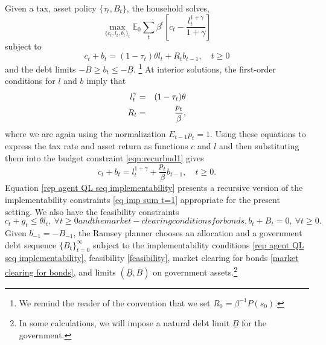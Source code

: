 \documentclass[thmsb,11pt]{article}
\begin{document}
Given a tax, asset policy $\{\tau_t,B_t\}$, the household solves,
\begin{equation}
 \max_{\{c_t,l_t,b_{t}\}_t}\mathbb{E}_0\sum_{t}\beta^t \left[c_t-\frac{l_t^{1+\gamma}}{1+\gamma}\right]
\end{equation}
subject to
\begin{equation}\label{eqn:recurbud1}
c_t+b_{t}=(1-\tau_t)\theta l_t+R_tb_{t-1} , \quad t\geq 0
\end{equation}
and the debt limits $  - \overline B \geq b_t \leq  - \underline B$.%
\footnote{We  remind the reader of  the convention  that we set  $R_{0}=\beta^{-1} P(s_0)$.}
At interior solutions, the first-order conditions %
for $l$ and $b$ imply that
\begin{eqnarray*}
l_t^\gamma & = &(1-\tau_t) \theta \cr
R_t & = & \frac{p_t}{\beta},
\end{eqnarray*}
where we are again using the normalization $E_{t-1} p_t = 1$.
Using these equations %
to express   the tax rate and asset return
 as functions   $c$ and $l$ and then substituting them into the  budget constraint \eqref{eqn:recurbud1} gives %
 \begin{equation} \label{rep agent QL seq implementability} c_t + b_t = l_t^{1+\gamma} + \frac{p_t}{\beta} b_{t-1}, \quad t \geq 0 .
 \end{equation}
 Equation \eqref{rep agent QL seq implementability} presents a recursive version of the implementability constraints \eqref{eq imp sum t=1} appropriate for the present setting.
We also have the feasibility constraints
\begin{subequations}
\begin{equation}
\label{feasibility}
c_t+g_t\leq\theta l_t, \ \forall t \geq 0
\end{equation}
and the market-clearing conditions for bonds,
\begin{equation}\label{market clearing for bonds} b_t+B_t=0, \ \forall t \geq 0 .\end{equation}
\end{subequations}
\noindent Given  $b_{-1}=-B_{-1}$, the Ramsey planner chooses an allocation and a government
 debt sequence $\{B_t \}_{t=0}^\infty$ subject to the implementability conditions \eqref{rep agent QL seq implementability},
feasibility \eqref{feasibility}, market clearing for bonds \eqref{market clearing for bonds},  and limits $(\underline{B},\overline{B})$ on government
assets.\footnote{In some calculations, we will impose a natural debt limit $\underline{B}$ for the government.}
\end{document}
